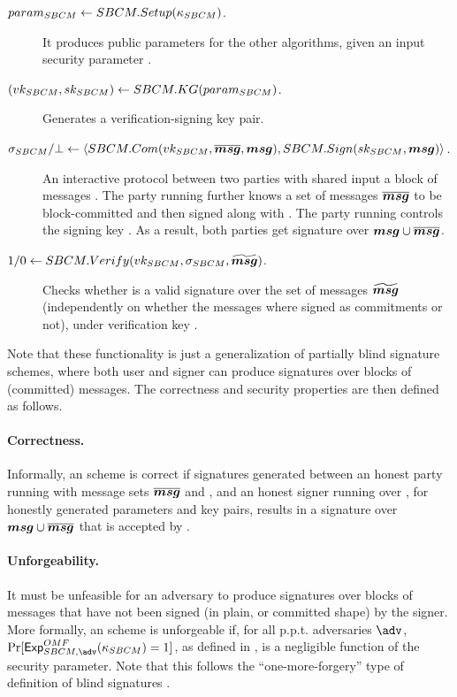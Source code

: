 \begin{description}
\item[$param_{SBCM} \gets SBCM.Setup(\kappa_{SBCM})$.] It produces public parameters
  for the other algorithms, given an input security parameter \Ssecpar.
\item[$(vk_{SBCM},sk_{SBCM}) \gets SBCM.KG(param_{SBCM})$.] Generates a
  verification-signing key pair.
\item[$\sigma_{SBCM}/\bot \gets \langle SBCM.Com(vk_{SBCM},\overline{\boldsymbol{msg}},\boldsymbol{msg}),
  SBCM.Sign(sk_{SBCM},\boldsymbol{msg}) \rangle$.] An interactive protocol between two
  parties with shared input a block of messages \smsg. The party running
  \SBCMCom further knows a set of messages $\overline{\boldsymbol{msg}}$ to be
  block-committed and then signed along with \smsg. The party running \SBCMSign
  controls the signing key \SBCMsk. As a result, both parties get signature
  \SBCMsig over $\boldsymbol{msg} \cup \overline{\boldsymbol{msg}}$.
\item[$1/0 \gets SBCM.Verify(vk_{SBCM},\sigma_{SBCM},\widetilde{\boldsymbol{msg}})$.] Checks
  whether \SBCMsig is a valid signature over the set of messages
  $\widetilde{\boldsymbol{msg}}$ (independently on whether the messages where signed as
  commitments or not), under verification key \SBCMvk.
\end{description}

Note that these functionality is just a generalization of partially blind
signature schemes, where both user and signer can produce signatures over
blocks of (committed) messages. The correctness and security properties are
then defined as follows.

\paragraph{Correctness.} %
Informally, an \SBCM scheme is correct if signatures generated between an honest
party running \SBCMCom with message sets $\overline{\boldsymbol{msg}}$ and \smsg, and an
honest signer running \SBCMSign over \smsg, for honestly generated parameters
and key pairs, results in a signature over $\boldsymbol{msg} \cup \overline{\boldsymbol{msg}}$ that is
accepted by \SBCMVerify. 

\paragraph{Unforgeability.} %
It must be unfeasible for an adversary to produce signatures over blocks of
messages that have not been signed (in plain, or committed shape) by the
signer. More formally, an \SBCM scheme is unforgeable if, for all p.p.t.
adversaries $\adv$, $\Pr[\ExpSBCMOMF(\SBCMsecpar) = 1]$, as defined in
, is a negligible function of the security parameter.
Note that this follows the ``one-more-forgery'' type of definition of blind
signatures \cite{bold02}.

